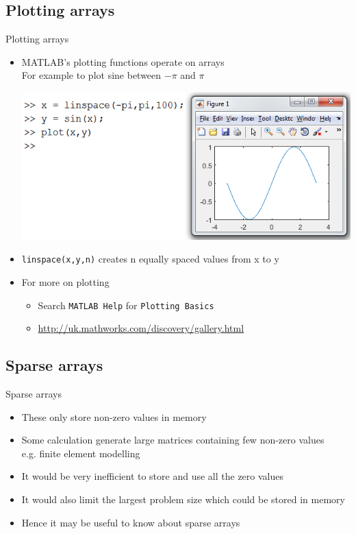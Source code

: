\documentclass{beamer}
\begin{document}
\subsection{Plotting arrays}
\begin{frame}{Plotting arrays}{}
	\begin{itemize}
		\item MATLAB's plotting functions operate on arrays\\
		For example to plot sine between $-\pi$ and $\pi$
		
		\includegraphics[width=\textwidth]{sine_plot}
		\item \texttt{linspace(x,y,n)} creates n equally spaced values from x to y
		\item For more on plotting
			\begin{itemize}
				\item Search \texttt{MATLAB Help} for \texttt{Plotting Basics}
				\item \url{http://uk.mathworks.com/discovery/gallery.html}
			\end{itemize}
	\end{itemize}
\end{frame}

\subsection{Sparse arrays}
\begin{frame}{Sparse arrays}{}
	\begin{itemize}
		\item These only store non-zero values in memory
		\item Some calculation generate large matrices containing few non-zero values\\
		e.g. finite element modelling
		\item It would be very inefficient to store and use all the zero values
		\item It would also limit the largest problem size which could be stored in memory
		\item Hence it may be useful to know about sparse arrays
	\end{itemize}
\end{frame}
\end{document}
